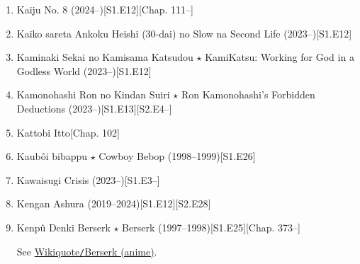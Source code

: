 \documentclass{article}
\begin{document}
\begin{enumerate}
    \item Kaiju No. 8 (2024--)\hfill[S1.E12][Chap. 111--]
    \item Kaiko sareta Ankoku Heishi (30-dai) no Slow na Second Life (2023--)\hfill[S1.E12]
    \item {\sc Kaminaki Sekai no Kamisama Katsudou $\star$ KamiKatsu: Working for God in a Godless World} (2023--)\hfill[S1.E12]
    \item {\sc Kamonohashi Ron no Kindan Suiri $\star$ Ron Kamonohashi's Forbidden Deductions} (2023--)\hfill[S1.E13][S2.E4--]
    \item {\sc Kattobi Itto}\hfill[Chap. 102]
    \item {\sc Kaub\^oi bibappu $\star$ Cowboy Bebop} (1998--1999)\hfill[S1.E26]
    \item Kawaisugi Crisis (2023--)\hfill[S1.E3--]
    \item {\sc Kengan Ashura} (2019--2024)\hfill[S1.E12][S2.E28]
    \item {\sc Kenp\^u Denki Berserk $\star$ Berserk} (1997--1998)\hfill[S1.E25][Chap. 373--]
    
    See \href{https://en.wikiquote.org/wiki/Berserk_(anime)}{Wikiquote{\tt/}Berserk (anime)}.
    

\end{enumerate}
\end{document}
